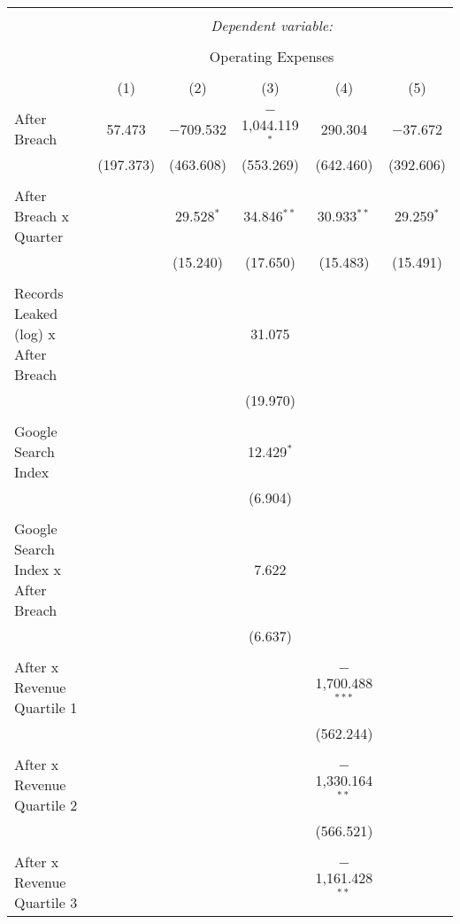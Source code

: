 
\begin{table}[!htbp] \centering 
  \caption{} 
  \label{} 
\begin{tabular}{@{\extracolsep{5pt}}lccccc} 
\\[-1.8ex]\hline 
\hline \\[-1.8ex] 
 & \multicolumn{5}{c}{\textit{Dependent variable:}} \\ 
\cline{2-6} 
\\[-1.8ex] & \multicolumn{5}{c}{Operating Expenses} \\ 
\\[-1.8ex] & (1) & (2) & (3) & (4) & (5)\\ 
\hline \\[-1.8ex] 
 After Breach & 57.473 & $-$709.532 & $-$1,044.119$^{*}$ & 290.304 & $-$37.672 \\ 
  & (197.373) & (463.608) & (553.269) & (642.460) & (392.606) \\ 
  & & & & & \\ 
 After Breach x Quarter &  & 29.528$^{*}$ & 34.846$^{**}$ & 30.933$^{**}$ & 29.259$^{*}$ \\ 
  &  & (15.240) & (17.650) & (15.483) & (15.491) \\ 
  & & & & & \\ 
 Records Leaked (log) x After Breach &  &  & 31.075 &  &  \\ 
  &  &  & (19.970) &  &  \\ 
  & & & & & \\ 
 Google Search Index &  &  & 12.429$^{*}$ &  &  \\ 
  &  &  & (6.904) &  &  \\ 
  & & & & & \\ 
 Google Search Index x After Breach &  &  & 7.622 &  &  \\ 
  &  &  & (6.637) &  &  \\ 
  & & & & & \\ 
 After x Revenue Quartile 1 &  &  &  & $-$1,700.488$^{***}$ &  \\ 
  &  &  &  & (562.244) &  \\ 
  & & & & & \\ 
 After x Revenue Quartile 2 &  &  &  & $-$1,330.164$^{**}$ &  \\ 
  &  &  &  & (566.521) &  \\ 
  & & & & & \\ 
 After x Revenue Quartile 3 &  &  &  & $-$1,161.428$^{**}$ &  \\ 

\end{tabular}
\end{table}
